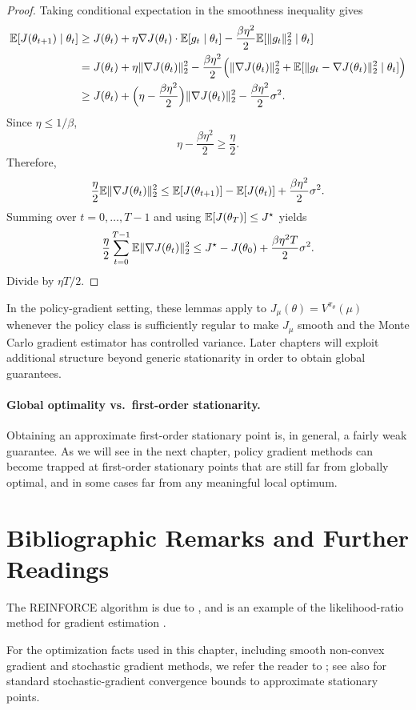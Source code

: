 \begin{proof}
Taking conditional expectation in the smoothness inequality gives
\begin{align*}
\mathbb{E}[J(\theta_{t+1})\mid \theta_t]
&\ge
J(\theta_t)
+
\eta \nabla J(\theta_t)\cdot \mathbb{E}[g_t\mid \theta_t]
-
\frac{\beta\eta^2}{2}\mathbb{E}[\|g_t\|_2^2\mid \theta_t] \\
&=
J(\theta_t)
+
\eta \|\nabla J(\theta_t)\|_2^2
-
\frac{\beta\eta^2}{2}
\Big(\|\nabla J(\theta_t)\|_2^2+\mathbb{E}[\|g_t-\nabla J(\theta_t)\|_2^2\mid \theta_t]\Big) \\
&\ge
J(\theta_t)
+
\Big(\eta-\frac{\beta\eta^2}{2}\Big)\|\nabla J(\theta_t)\|_2^2
-
\frac{\beta\eta^2}{2}\sigma^2.
\end{align*}
Since $\eta\le 1/\beta$,
\[
\eta-\frac{\beta\eta^2}{2}\ge \frac{\eta}{2}.
\]
Therefore,
\[
\frac{\eta}{2}\mathbb{E}\|\nabla J(\theta_t)\|_2^2
\le
\mathbb{E}[J(\theta_{t+1})]-\mathbb{E}[J(\theta_t)] + \frac{\beta\eta^2}{2}\sigma^2.
\]
Summing over $t=0,\ldots,T-1$ and using $\mathbb{E}[J(\theta_T)]\le J^\star$ yields
\[
\frac{\eta}{2}\sum_{t=0}^{T-1}\mathbb{E}\|\nabla J(\theta_t)\|_2^2
\le
J^\star-J(\theta_0)+\frac{\beta\eta^2 T}{2}\sigma^2.
\]
Divide by $\eta T/2$.
\end{proof}

In the policy-gradient setting, these lemmas apply to $J_\mu(\theta)=V^{\pi_\theta}(\mu)$
whenever the policy class is sufficiently regular to make $J_\mu$ smooth and the Monte Carlo
gradient estimator has controlled variance. Later chapters will exploit additional structure
beyond generic stationarity in order to obtain global guarantees.

\paragraph{Global optimality vs.\ first-order stationarity.}
Obtaining an approximate first-order stationary point is, in general,
a fairly weak guarantee. As we will see in the next chapter, policy
gradient methods can become trapped at first-order stationary points
that are still far from globally optimal, and in some cases far from
any meaningful local optimum. 

\section{Bibliographic Remarks and Further Readings}\label{bib:pg_basics}

The REINFORCE algorithm is due to \cite{williams1992simple}, and is an example of the
likelihood-ratio method for gradient estimation \cite{glynn_likelihood}.

For the optimization facts used in this chapter, including smooth non-convex gradient
and stochastic gradient methods, we refer the reader to \cite{book:beck}; see also
\cite{DBLP:journals/siamjo/GhadimiL13a} for standard stochastic-gradient convergence
bounds to approximate stationary points.



